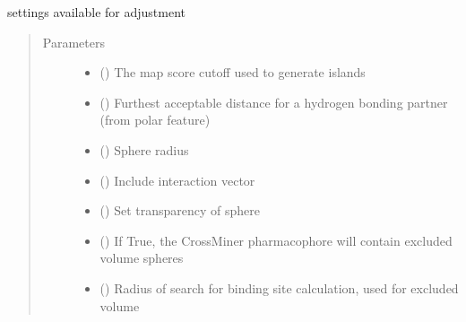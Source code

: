 \documentclass[letterpaper,10pt,english]{sphinxmanual}
\begin{document}
\begin{fulllineitems}
\begin{fulllineitems}
\label{\detokenize{hs_pharmacophore_api:hotspots.hs_pharmacophore.PharmacophoreModel.Settings}}
settings available for adjustment
\begin{quote}\begin{description}
\item[{Parameters}] \leavevmode\begin{itemize}
\item {} 
 () \textendash{} The map score cutoff used to generate islands

\item {} 
 () \textendash{} Furthest acceptable distance for a hydrogen bonding partner (from polar feature)

\item {} 
 () \textendash{} Sphere radius

\item {} 
 () \textendash{} Include interaction vector

\item {} 
 () \textendash{} Set transparency of sphere

\item {} 
 () \textendash{} If True, the CrossMiner pharmacophore will contain excluded volume spheres

\item {} 
 () \textendash{} Radius of search for binding site calculation, used for excluded volume


\end{itemize}
\end{description}
\end{quote}
\end{fulllineitems}
\end{fulllineitems}
\end{document}
